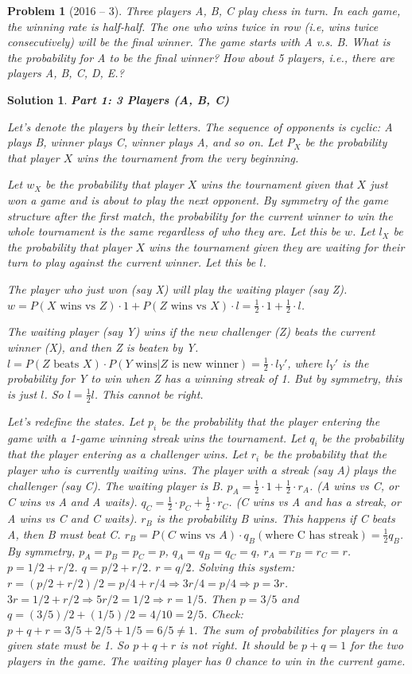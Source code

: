 \documentclass[12pt]{amsart}
\newtheorem{problem}{Problem}
\newtheorem*{solution}{Solution}
\begin{document}
\begin{problem}[2016 -- 3]
Three players A, B, C play chess in turn. In each game, the winning rate is half-half. The one who wins twice in row (i.e, wins twice consecutively) will be the final winner. The game starts with A v.s. B.
What is the probability for A to be the final winner?
How about 5 players, i.e., there are players A, B, C, D, E.?
\end{problem}
\begin{solution}
\textbf{Part 1: 3 Players (A, B, C)}

Let's denote the players by their letters. The sequence of opponents is cyclic: A plays B, winner plays C, winner plays A, and so on. Let $P_X$ be the probability that player $X$ wins the tournament from the very beginning.

Let $w_X$ be the probability that player $X$ wins the tournament given that $X$ just won a game and is about to play the next opponent. By symmetry of the game structure after the first match, the probability for the current winner to win the whole tournament is the same regardless of who they are. Let this be $w$.
Let $l_X$ be the probability that player $X$ wins the tournament given they are waiting for their turn to play against the current winner. Let this be $l$.

The player who just won (say X) will play the waiting player (say Z).
$w = P(X \text{ wins vs } Z) \cdot 1 + P(Z \text{ wins vs } X) \cdot l = \frac{1}{2} \cdot 1 + \frac{1}{2} \cdot l$.

The waiting player (say Y) wins if the new challenger (Z) beats the current winner (X), and then Z is beaten by Y.
$l = P(Z \text{ beats } X) \cdot P(Y \text{ wins} | Z \text{ is new winner}) = \frac{1}{2} \cdot l_Y'$, where $l_Y'$ is the probability for Y to win when Z has a winning streak of 1. But by symmetry, this is just $l$.
So $l = \frac{1}{2}l$. This cannot be right.

Let's redefine the states. Let $p_i$ be the probability that the player entering the game with a 1-game winning streak wins the tournament. Let $q_i$ be the probability that the player entering as a challenger wins. Let $r_i$ be the probability that the player who is currently waiting wins.
The player with a streak (say A) plays the challenger (say C). The waiting player is B.
$p_A = \frac{1}{2} \cdot 1 + \frac{1}{2} \cdot r_A$. (A wins vs C, or C wins vs A and A waits).
$q_C = \frac{1}{2} \cdot p_C + \frac{1}{2} \cdot r_C$. (C wins vs A and has a streak, or A wins vs C and C waits).
$r_B$ is the probability B wins. This happens if C beats A, then B must beat C.
$r_B = P(C \text{ wins vs } A) \cdot q_B(\text{where C has streak}) = \frac{1}{2} q_B$.
By symmetry, $p_A=p_B=p_C=p$, $q_A=q_B=q_C=q$, $r_A=r_B=r_C=r$.
$p = 1/2 + r/2$.
$q = p/2 + r/2$.
$r = q/2$.
Solving this system:
$r = (p/2 + r/2)/2 = p/4 + r/4 \Rightarrow 3r/4 = p/4 \Rightarrow p=3r$.
$3r = 1/2 + r/2 \Rightarrow 5r/2 = 1/2 \Rightarrow r=1/5$.
Then $p=3/5$ and $q=(3/5)/2 + (1/5)/2 = 4/10 = 2/5$.
Check: $p+q+r = 3/5+2/5+1/5 = 6/5 \neq 1$. The sum of probabilities for players in a given state must be 1. So $p+q+r$ is not right. It should be $p+q=1$ for the two players in the game. The waiting player has 0 chance to win in the current game.


\end{solution}
\end{document}
